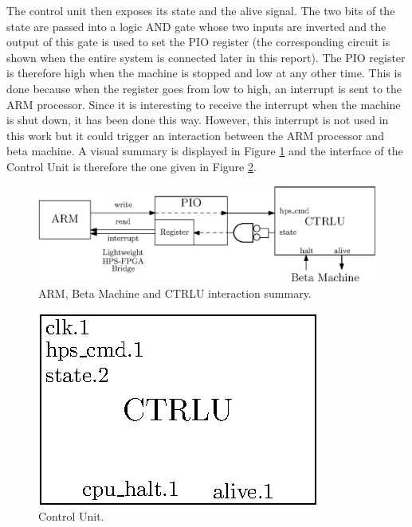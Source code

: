 The control unit then exposes its state and the alive signal. The two bits of the state are passed 
into a logic AND gate whose two inputs are inverted and the output of this gate is used to set the 
PIO register (the corresponding circuit is shown when the entire system is connected later in this 
report). The PIO register is  therefore high when the machine is stopped and low at any other time. 
This is done because when the register goes from low to high, an interrupt is sent to the ARM 
processor. Since it is interesting to receive the interrupt when the machine is shut down, it has been 
done this way. However, this interrupt is not used in this work but it could trigger an interaction between the ARM processor and beta machine. 
A visual summary is displayed in Figure \ref{fig:ctrlu/summary} and the interface of the Control 
Unit is therefore the one given in Figure \ref{fig:ctrlu}.

\begin{figure}[ht!]
    \center
    \includegraphics[scale=0.8]{"Chapter5-MAU_CTRLU/res/ctrlu_summary"}
    \caption{ARM, Beta Machine and CTRLU interaction summary.}
    \label{fig:ctrlu/summary}
\end{figure}

\begin{figure}[ht!]
    \center
    \includegraphics[scale=0.8]{"Chapter5-MAU_CTRLU/res/ctrlu"}
    \caption{Control Unit.}
    \label{fig:ctrlu}
\end{figure}
